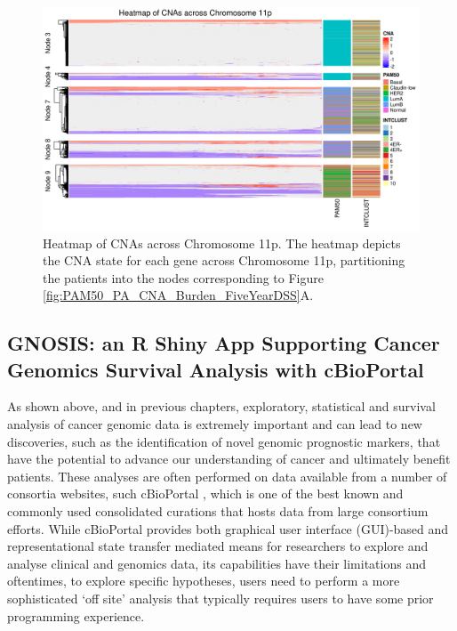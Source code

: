 \vfill 

\begin{figure}[H]
  \centering
  \includegraphics[width=1\textwidth]{../figures/Chapter_3/PA_PartyKit_Survival_Burden_FiveYearDSS_PAM50.png_11p_All_Heatmap.png}
  \caption[Heatmap of CNAs across Chromosome 11p.]{Heatmap of CNAs across Chromosome 11p. The heatmap depicts the CNA state for each gene across Chromosome 11p, partitioning the patients into the nodes corresponding to Figure \ref{fig:PAM50_PA_CNA_Burden_FiveYearDSS}A.}
  \label{PA_SurvTrees_Burden_Heatmaps_11p}
\end{figure}

\subsection{GNOSIS: an R Shiny App Supporting Cancer Genomics Survival Analysis with cBioPortal}
As shown above, and in previous chapters, exploratory, statistical and survival analysis of cancer genomic data is extremely important and can lead to new discoveries, such as the identification of novel genomic prognostic markers, that have the potential to advance our understanding of cancer and ultimately benefit patients. These analyses are often performed on data available from a number of consortia websites, such cBioPortal \citep{pmid22588877, pmid23550210}, which is one of the best known and commonly used consolidated curations that hosts data from large consortium efforts. While cBioPortal provides both graphical user interface (GUI)-based and representational state transfer mediated means for researchers to explore and analyse clinical and genomics data, its capabilities have their limitations and oftentimes, to explore specific hypotheses, users need to perform a more sophisticated ‘off site’ analysis that typically requires users to have some prior programming experience. 

